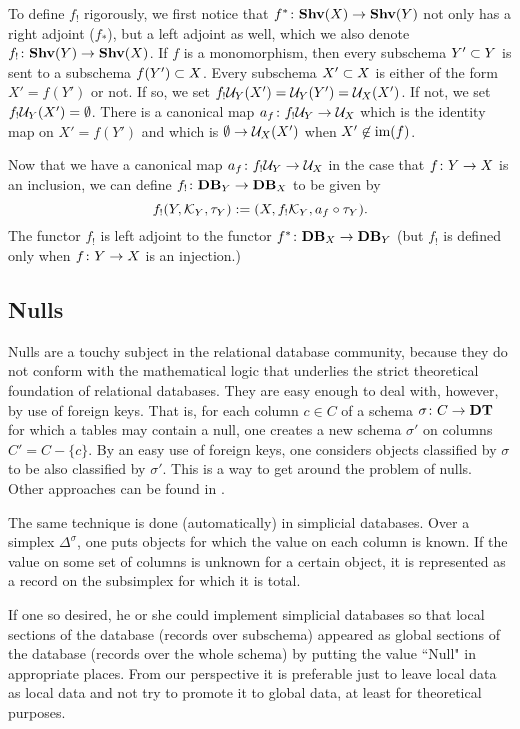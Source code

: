 \documentclass{amsart}
\begin{document}
To define $f_!$ rigorously, we first notice that $f^*\taking\Shv(X)\to\Shv(Y)$ not only has a right adjoint ($f_*$), but a left adjoint as well, which we also denote $f_!\taking\Shv(Y)\to\Shv(X)$.  If $f$ is a monomorphism, then every subschema $Y'\ss Y$ is sent to a subschema $f(Y')\ss X$.  Every subschema $X'\ss X$ is either of the form $X'=f(Y')$ or not.  If so, we set $f_!\mcU_Y(X')=\mcU_Y(Y')=\mcU_X(X')$.  If not, we set $f_!\mcU_Y(X')=\emptyset$.  There is a canonical map $a_f\taking f_!\mcU_Y\to\mcU_X$ which is the identity map on $X'=f(Y')$ and which is $\emptyset\to\mcU_X(X')$ when $X'\not\in\im(f)$.

Now that we have a canonical map $a_f\taking f_!\mcU_Y\to\mcU_X$ in the case that $f\taking Y\to X$ is an inclusion, we can define $f_!\taking\Data_Y\to\Data_X$ to be given by $$f_!(Y,\mcK_Y,\tau_Y):=(X,f_!\mcK_Y,a_f\circ\tau_Y).$$  The functor $f_!$ is left adjoint to the functor $f^*\taking\Data_X\to\Data_Y$ (but $f_!$ is defined only when $f\taking Y\to X$ is an injection.)

\subsection{Nulls}\label{subsec:nulls}

Nulls are a touchy subject in the relational database community, because they do not conform with the mathematical logic that underlies the strict theoretical foundation of relational databases.  They are easy enough to deal with, however, by use of foreign keys.  That is, for each column $c\in C$ of a schema $\sigma\taking C\to\DT$ for which a tables may contain a null, one creates a new schema $\sigma'$ on columns $C'=C-\{c\}$.  By an easy use of foreign keys, one considers objects classified by $\sigma$ to be also classified by $\sigma'$.  This is a way to get around the problem of nulls.  Other approaches can be found in \cite{JR}.

The same technique is done (automatically) in simplicial databases.  Over a simplex $\Delta^\sigma$, one puts objects for which the value on each column is known.  If the value on some set of columns is unknown for a certain object, it is represented as a record on the subsimplex for which it is total.  

If one so desired, he or she could implement simplicial databases so that local sections of the database (records over subschema) appeared as global sections of the database (records over the whole schema) by putting the value ``Null" in appropriate places.  From our perspective it is preferable just to leave local data as local data and not try to promote it to global data, at least for theoretical purposes.
\end{document}
